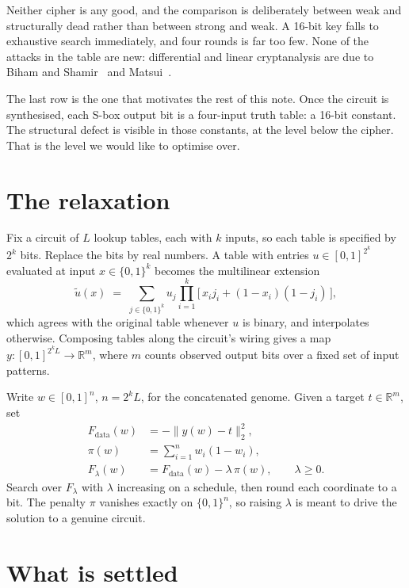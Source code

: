 \documentclass[11pt,a4paper]{article}
\begin{document}
Neither cipher is any good, and the comparison is deliberately between weak and
structurally dead rather than between strong and weak. A 16-bit key falls to
exhaustive search immediately, and four rounds is far too few. None of the
attacks in the table are new: differential and linear cryptanalysis are due to
Biham and Shamir~\cite{biham} and Matsui~\cite{matsui}.

The last row is the one that motivates the rest of this note. Once the circuit is
synthesised, each S-box output bit is a four-input truth table: a 16-bit
constant. The structural defect is visible in those constants, at the level
below the cipher. That is the level we would like to optimise over.

\section{The relaxation}

Fix a circuit of $L$ lookup tables, each with $k$ inputs, so each table is
specified by $2^k$ bits. Replace the bits by real numbers. A table with entries
$u\in[0,1]^{2^k}$ evaluated at input $x\in\{0,1\}^k$ becomes the multilinear
extension
\begin{equation}
  \widetilde{u}(x) \;=\; \sum_{j\in\{0,1\}^k} u_j \prod_{i=1}^{k}
  \bigl[\, x_i j_i + (1-x_i)(1-j_i) \,\bigr],
\end{equation}
which agrees with the original table whenever $u$ is binary, and interpolates
otherwise. Composing tables along the circuit's wiring gives a map
$y:[0,1]^{2^kL}\to\mathbb{R}^m$, where $m$ counts observed output bits over a
fixed set of input patterns.

Write $w\in[0,1]^{n}$, $n=2^kL$, for the concatenated genome. Given a target
$t\in\mathbb{R}^m$, set
\begin{align}
  F_{\mathrm{data}}(w) &= -\lVert y(w)-t\rVert_2^2, \\
  \pi(w) &= \sum_{i=1}^{n} w_i(1-w_i), \\
  F_\lambda(w) &= F_{\mathrm{data}}(w) - \lambda\,\pi(w), \qquad \lambda\ge 0 .
  \label{eq:obj}
\end{align}
Search over $F_\lambda$ with $\lambda$ increasing on a schedule, then round each
coordinate to a bit. The penalty $\pi$ vanishes exactly on $\{0,1\}^n$, so
raising $\lambda$ is meant to drive the solution to a genuine circuit.

\section{What is settled}
\end{document}
